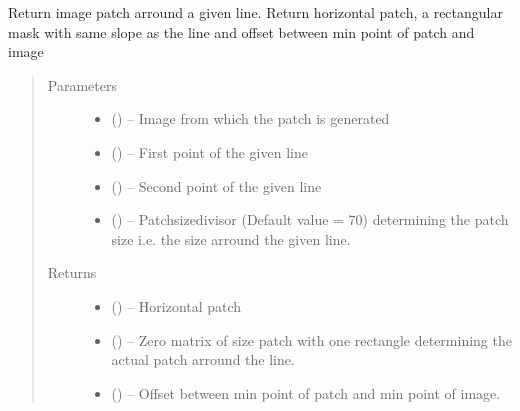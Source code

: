 \documentclass[letterpaper,10pt,english]{sphinxmanual}
\begin{document}
\begin{fulllineitems}
\label{\detokenize{image_lines:image_lines.get_patch}}
Return image patch arround a given line.
Return horizontal patch, a rectangular mask with same slope as the line and
offset between min point of patch and image
\begin{quote}\begin{description}
\item[{Parameters}] \leavevmode\begin{itemize}
\item {} 
 () -- Image from which the patch is generated

\item {} 
 () -- First point of the given line

\item {} 
 () -- Second point of the given line

\item {} 
 () -- Patchsizedivisor (Default value = 70) determining the patch size i.e.
the size arround the given line.

\end{itemize}

\item[{Returns}] \leavevmode
\begin{itemize}
\item {} 
 () -- Horizontal patch

\item {} 
 () -- Zero matrix of size patch with one rectangle determining the
actual patch arround the line.

\item {} 
 () -- Offset between min point of patch and min point of image.

\end{itemize}


\end{description}\end{quote}

\end{fulllineitems}
\end{document}
